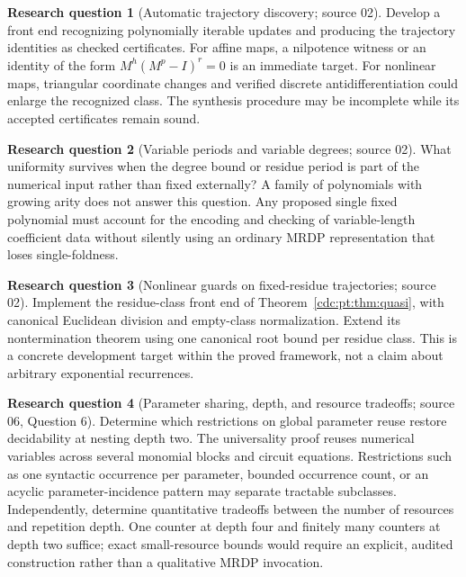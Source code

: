\documentclass[11pt,a4paper]{article}
\theoremstyle{definition}
\newtheorem{question}[question]{Research question}
\theoremstyle{remark}
\begin{document}
\begin{question}[Automatic trajectory discovery; source 02]
Develop a front end recognizing polynomially iterable updates and
producing the trajectory identities as checked certificates. For affine
maps, a nilpotence witness or an identity of the form
$M^h(M^p-I)^r=0$ is an immediate target. For nonlinear maps, triangular
coordinate changes and verified discrete antidifferentiation could enlarge
the recognized class. The synthesis procedure may be incomplete while its
accepted certificates remain sound.
\end{question}

\begin{question}[Variable periods and variable degrees; source 02]
What uniformity survives when the degree bound or residue period is part
of the numerical input rather than fixed externally? A family of
polynomials with growing arity does not answer this question. Any proposed
single fixed polynomial must account for the encoding and checking of
variable-length coefficient data without silently using an ordinary MRDP
representation that loses single-foldness.
\end{question}

\begin{question}[Nonlinear guards on fixed-residue trajectories; source 02]
Implement the residue-class front end of Theorem~\ref{cdc:pt:thm:quasi}, with
canonical Euclidean division and empty-class normalization. Extend its
nontermination theorem using one canonical root bound per residue class.
This is a concrete development target within the proved framework,
not a claim about arbitrary exponential recurrences.
\end{question}

\begin{question}[Parameter sharing, depth, and resource tradeoffs; source 06, Question 6]
Determine which restrictions on global parameter reuse
restore decidability at nesting depth two. The universality proof reuses
numerical variables across several monomial blocks and circuit equations.
Restrictions such as one syntactic occurrence per parameter, bounded
occurrence count, or an acyclic parameter-incidence pattern may separate
tractable subclasses. Independently, determine quantitative tradeoffs between
the number of resources and repetition depth. One counter at depth four and
finitely many counters at depth two suffice; exact small-resource bounds
would require an explicit, audited construction rather than a qualitative
MRDP invocation.
\end{question}
\end{document}
